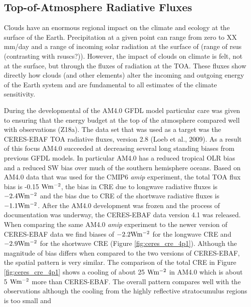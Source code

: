 \documentclass[draft]{agujournal2019}
\begin{document}
\subsection {Top-of-Atmosphere Radiative Fluxes}

Clouds have an enormous regional impact on the climate and ecology at the surface of the Earth.   Precipitation 
at a given point can range from zero to XX mm/day and a range of incoming solar radiation at the surface of 
(range of rsus (contrasting with rsuscs?)).  However, the impact of clouds on climate is felt, not at the surface, 
but through the fluxes of radiation at the TOA.   These fluxes show directly how clouds (and other elements) alter
the incoming and outgoing energy of the Earth system and are fundamental to all estimates of the 
climate sensitivity.  

During the developmental of the AM4.0 GFDL model particular care was given to ensuring that the energy budget at 
the top of the atmosphere compared well with observations (Z18a).  The data set that was used as a target
was the CERES-EBAF TOA radiative fluxes, version 2.8 (Loeb et al., 2009).  
As a result of this focus AM4.0 succeeded at decreasing several long standing biases from previous GFDL models.  
In particular AM4.0 has a reduced tropical OLR bias and a reduced SW bias over much of the southern hemisphere oceans.   
Based on AM4.0 data that was used for the CMIP6 \textit{amip} experiment, the total TOA flux bias is -0.15 $ \rm{W m^{-2}}$,  %
the bias in CRE due to longwave radiative fluxes is $-2.4 \rm{W m^{-2}} $ and the bias due to CRE of the shortwave radiative fluxes   
is $-1.1 \rm{W m^{-2}} $.  
After the AM4.0 development was frozen and the process of documentation 
was underway, the CERES-EBAF data version 4.1 was released.  When comparing the same 
AM4.0 \textit{amip} experiment to the 
newer version of CERES-EBAF data we find biases of $-2.2 \rm{W m^{-2}} $ for the longwave CRE and 
$-2.9 \rm{W m^{-2}} $ for the shortwave CRE (Figure \ref{fig:ceres_cre_4p1}).  Although the magnitude of bias 
differs when compared to the two versions of CERES-EBAF, the spatial pattern is very similar.   
The comparison of the total 
CRE in Figure \ref{fig:ceres_cre_4p1}  shows a cooling of about 25 $\rm{W m^{-2}}$ in AM4.0 which is about 
5 $\rm{W m^{-2}}$ more than CERES-EBAF.  The overall pattern compares
well with the observations although the cooling from the highly reflective stratocumulus regions is too small and
\end{document}
